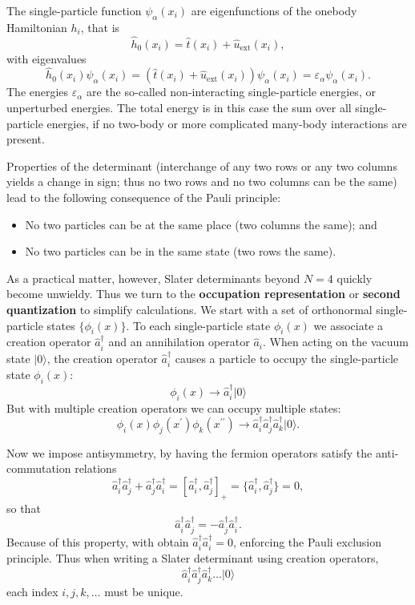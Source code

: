 The single-particle function $\psi_{\alpha}(x_i)$  are eigenfunctions of the onebody
Hamiltonian $h_i$, that is
\[
\hat{h}_0(x_i)=\hat{t}(x_i) + \hat{u}_{\mathrm{ext}}(x_i),
\]
with eigenvalues 
\[
\hat{h}_0(x_i) \psi_{\alpha}(x_i)=\left(\hat{t}(x_i) + \hat{u}_{\mathrm{ext}}(x_i)\right)\psi_{\alpha}(x_i)=\varepsilon_{\alpha}\psi_{\alpha}(x_i).
\]
The energies $\varepsilon_{\alpha}$ are the so-called non-interacting single-particle energies, or unperturbed energies. 
The total energy is in this case the sum over all  single-particle energies, if no two-body or more complicated
many-body interactions are present.

Properties of the determinant (interchange of any two rows or 
any two columns yields a change in sign; thus no two rows and no 
two columns can be the same) lead to the following consequence of the Pauli principle:

\begin{itemize}
\item No two particles can be at the same place (two columns the same); and

\item No two particles can be in the same state (two rows the same).
\end{itemize}

\noindent
As a practical matter, however, Slater determinants beyond $N=4$
quickly become unwieldy. Thus we turn to the \textbf{occupation representation} or \textbf{second quantization} to simplify
calculations.
We start with a set of orthonormal single-particle states
$\{ \phi_i(x) \}$.  To each single-particle state $\phi_i(x)$ we associate a creation operator 
$\hat{a}^\dagger_i$ and an annihilation operator $\hat{a}_i$. 
When acting on the vacuum state $| 0 \rangle$, the creation operator $\hat{a}^\dagger_i$ causes 
a particle to occupy the single-particle state $\phi_i(x)$:
\[
\phi_i(x) \rightarrow \hat{a}^\dagger_i |0 \rangle
\]
But with multiple creation operators we can occupy multiple states:
\[
\phi_i(x) \phi_j(x^\prime) \phi_k(x^{\prime \prime}) 
\rightarrow \hat{a}^\dagger_i \hat{a}^\dagger_j \hat{a}^\dagger_k |0 \rangle.
\]

Now we impose antisymmetry, by having the fermion operators satisfy  the anti-commutation relations
\[
\hat{a}^\dagger_i \hat{a}^\dagger_j + \hat{a}^\dagger_j \hat{a}^\dagger_i
= [ \hat{a}^\dagger_i ,\hat{a}^\dagger_j ]_+ 
= \{ \hat{a}^\dagger_i ,\hat{a}^\dagger_j \} = 0,
\]
so that 
\[
\hat{a}^\dagger_i \hat{a}^\dagger_j = - \hat{a}^\dagger_j \hat{a}^\dagger_i.
\]
Because of this property, with obtain $\hat{a}^\dagger_i \hat{a}^\dagger_i = 0$, 
enforcing the Pauli exclusion principle.  Thus when writing a Slater determinant 
using creation operators, 
\[
\hat{a}^\dagger_i \hat{a}^\dagger_j \hat{a}^\dagger_k \ldots |0 \rangle
\]
each index $i,j,k, \ldots$ must be unique.


